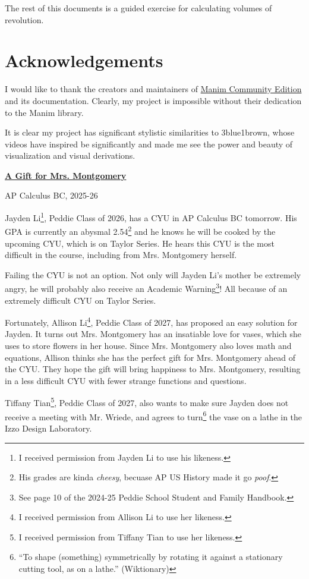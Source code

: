 \documentclass{article}
\begin{document}
The rest of this documents is a guided exercise for calculating volumes of revolution.

\section{Acknowledgements}

I would like to thank the creators and maintainers of \href{https://www.manim.community/}{Manim Community Edition} and its documentation. Clearly, my project is impossible without their dedication to the Manim library.

It is clear my project has significant stylistic similarities to 3blue1brown, whose videos have inspired be significantly and made me see the power and beauty of visualization and visual derivations.

\newpage

\begin{center}
	\textbf{\underline{A Gift for Mrs. Montgomery}}

	AP Calculus BC, 2025-26
\end{center}

Jayden Li\footnote{I received permission from Jayden Li to use his likeness.}, Peddie Class of 2026, has a CYU in AP Calculus BC tomorrow. His GPA is currently an abysmal 2.54\footnote{His grades are kinda \textit{cheesy}, becuase AP US History made it go \textit{poof}.} and he knows he will be cooked by the upcoming CYU, which is on Taylor Series. He hears this CYU is the most difficult in the course, including from Mrs. Montgomery herself.

Failing the CYU is not an option. Not only will Jayden Li's mother be extremely angry, he will probably also receive an Academic Warning\footnote{See page 10 of the 2024-25 Peddie School Student and Family Handbook.}! All because of an extremely difficult CYU on Taylor Series.

Fortunately, Allison Li\footnote{I received permission from Allison Li to use her likeness.}, Peddie Class of 2027, has proposed an easy solution for Jayden. It turns out Mrs. Montgomery has an insatiable love for vases, which she uses to store flowers in her house. Since Mrs. Montgomery also loves math and equations, Allison thinks she has the perfect gift for Mrs. Montgomery ahead of the CYU. They hope the gift will bring happiness to Mrs. Montgomery, resulting in a less difficult CYU with fewer strange functions and questions.

Tiffany Tian\footnote{I received permission from Tiffany Tian to use her likeness.}, Peddie Class of 2027, also wants to make sure Jayden does not receive a meeting with Mr. Wriede, and agrees to turn\footnote{``To shape (something) symmetrically by rotating it against a stationary cutting tool, as on a lathe.'' (Wiktionary)} the vase on a lathe in the Izzo Design Laboratory.
\end{document}
